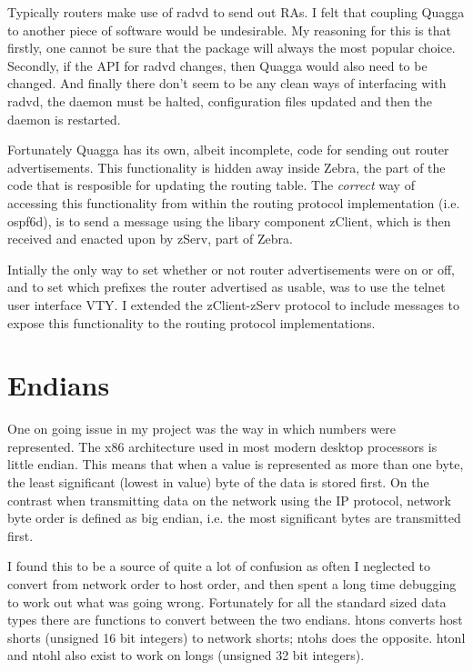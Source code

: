 \documentclass[12pt]{report}
\begin{document}
Typically routers make use of radvd  to send out RAs. I felt that coupling Quagga to 
another piece of software would be undesirable. My reasoning for this 
is that firstly, one cannot be sure that the package will always the 
most popular choice. Secondly, if the API for radvd changes, then 
Quagga would also need to be changed. And finally there don't seem to 
be any clean ways of interfacing with radvd, the daemon must be 
halted, configuration files updated and then the daemon is restarted.

Fortunately Quagga has its own, albeit incomplete, code for sending 
out router advertisements. This functionality is hidden away inside 
Zebra, the part of the code that is resposible for updating the 
routing table. The \emph{correct} way of accessing this functionality 
from within the routing protocol implementation (i.e. ospf6d), is to 
send a message using the libary component zClient, which is then
received and enacted upon by zServ, part of Zebra. 

Intially the only way to set whether or not router advertisements were 
on or off, and to set which prefixes the router advertised as usable, 
was to use the telnet user interface VTY. I extended the zClient-zServ 
protocol to include messages to expose this functionality to the 
routing protocol implementations. 

\section{Endians}
One on going issue in my project was the way in which numbers were 
represented. The x86 architecture used in most modern desktop 
processors is little endian. This means that when a value is 
represented as more than one byte, the least significant (lowest in 
value) byte of the data is stored first. On the contrast when 
transmitting data on the network using the IP protocol, network byte 
order is defined as big endian, i.e. the most significant bytes are 
transmitted first. 

I found this to be a source of quite a lot of confusion as often I 
neglected to convert from network order to host order, and then spent 
a long time debugging to work out what was going wrong. Fortunately 
for all the standard sized data types there are functions to convert 
between the two endians. htons converts host shorts (unsigned 
16 bit integers) to network shorts; ntohs does the opposite. htonl and 
ntohl also exist to work on longs (unsigned 32 bit integers). 
\end{document}
